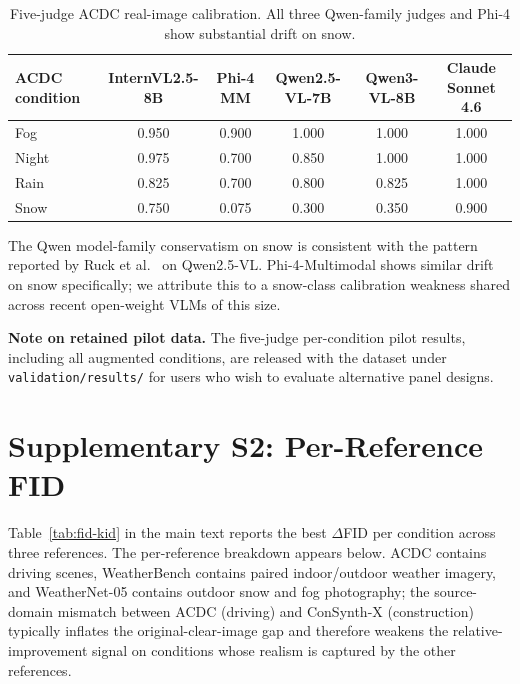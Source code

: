 \documentclass[12pt]{article}
\begin{document}
\begin{table}[H]
\centering
\caption{Five-judge ACDC real-image calibration. All three Qwen-family judges and Phi-4 show substantial drift on snow.}
\label{tab:supp-acdc-calibration}
\small
\begin{tabular}{lccccc}
\toprule
\textbf{ACDC condition} & \textbf{InternVL2.5-8B} & \textbf{Phi-4 MM} & \textbf{Qwen2.5-VL-7B} & \textbf{Qwen3-VL-8B} & \textbf{Claude Sonnet 4.6} \\
\midrule
Fog   & 0.950 & 0.900 & 1.000 & 1.000 & 1.000 \\
Night & 0.975 & 0.700 & 0.850 & 1.000 & 1.000 \\
Rain  & 0.825 & 0.700 & 0.800 & 0.825 & 1.000 \\
Snow  & 0.750 & 0.075 & 0.300 & 0.350 & 0.900 \\
\bottomrule
\end{tabular}
\end{table}

The Qwen model-family conservatism on snow is consistent with the pattern reported by Ruck et al.~\citep{ruck2026scalable} on Qwen2.5-VL. Phi-4-Multimodal shows similar drift on snow specifically; we attribute this to a snow-class calibration weakness shared across recent open-weight VLMs of this size.

\textbf{Note on retained pilot data.} The five-judge per-condition pilot results, including all augmented conditions, are released with the dataset under \texttt{validation/results/} for users who wish to evaluate alternative panel designs.


\section*{Supplementary S2: Per-Reference FID}
\label{sec:supp-fid}

Table~\ref{tab:fid-kid} in the main text reports the best $\Delta$FID per condition across three references. The per-reference breakdown appears below. ACDC contains driving scenes, WeatherBench contains paired indoor/outdoor weather imagery, and WeatherNet-05 contains outdoor snow and fog photography; the source-domain mismatch between ACDC (driving) and ConSynth-X (construction) typically inflates the original-clear-image gap and therefore weakens the relative-improvement signal on conditions whose realism is captured by the other references.
\end{document}
